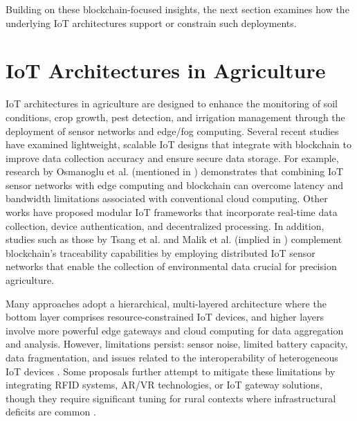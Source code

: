 \documentclass[12pt,onecolumn]{IEEEtran} %
\begin{document}
Building on these blockchain-focused insights, the next section examines how the underlying IoT architectures support or constrain such deployments.

\section{IoT Architectures in Agriculture}
IoT architectures in agriculture are designed to enhance the monitoring of soil conditions, crop growth, pest detection, and irrigation management through the deployment of sensor networks and edge/fog computing. Several recent studies have examined lightweight, scalable IoT designs that integrate with blockchain to improve data collection accuracy and ensure secure data storage. For example, research by Osmanoglu et al. (mentioned in \cite{ellahi2023blockchainbasedframeworksfor}) demonstrates that combining IoT sensor networks with edge computing and blockchain can overcome latency and bandwidth limitations associated with conventional cloud computing. Other works have proposed modular IoT frameworks that incorporate real-time data collection, device authentication, and decentralized processing. In addition, studies such as those by Tsang et al. \cite{tang2024assessingblockchainand} and Malik et al. (implied in \cite{ellahi2023blockchainbasedframeworksfor}) complement blockchain's traceability capabilities by employing distributed IoT sensor networks that enable the collection of environmental data crucial for precision agriculture.

Many approaches adopt a hierarchical, multi-layered architecture where the bottom layer comprises resource-constrained IoT devices, and higher layers involve more powerful edge gateways and cloud computing for data aggregation and analysis. However, limitations persist: sensor noise, limited battery capacity, data fragmentation, and issues related to the interoperability of heterogeneous IoT devices \cite{aliyu2023blockchainbasedsmartfarm, ali2022blockchainenabledarchitecture}. Some proposals further attempt to mitigate these limitations by integrating RFID systems, AR/VR technologies, or IoT gateway solutions, though they require significant tuning for rural contexts where infrastructural deficits are common \cite{tang2024assessingblockchainand}.
\end{document}
